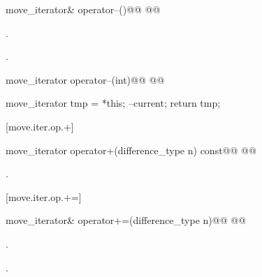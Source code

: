 %
%
\begin{itemdecl}
move_iterator& operator--()@\removed{;}@
  @@
\end{itemdecl}

\begin{itemdescr}
\pnum
\effects {}.

\pnum
\returns {}.
\end{itemdescr}

%
%
\begin{itemdecl}
move_iterator operator--(int)@\removed{;}@
  @@
\end{itemdecl}

\begin{itemdescr}
\pnum
\effects
\begin{codeblock}
move_iterator tmp = *this;
--current;
return tmp;
\end{codeblock}
\end{itemdescr}

[move.iter.op.+]{}

%
%
\begin{itemdecl}
move_iterator operator+(difference_type n) const@\removed{;}@
  @@
\end{itemdecl}

\begin{itemdescr}
\pnum
\returns {}.
\end{itemdescr}

[move.iter.op.+=]{}

%
%
\begin{itemdecl}
move_iterator& operator+=(difference_type n)@\removed{;}@
  @@
\end{itemdecl}

\begin{itemdescr}
\pnum
\effects {}.

\pnum
\returns {}.
\end{itemdescr}

